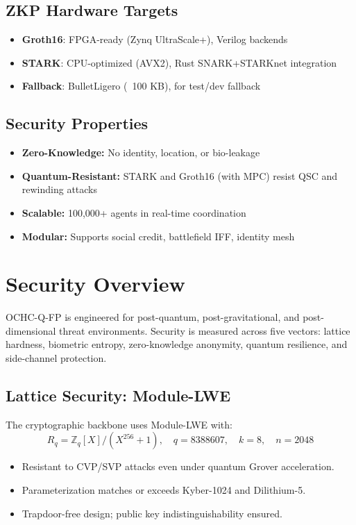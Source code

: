 \documentclass[12pt]{article}
\begin{document}
\subsection*{ZKP Hardware Targets}

\begin{itemize}
    \item \textbf{Groth16}: FPGA-ready (Zynq UltraScale+), Verilog backends
    \item \textbf{STARK}: CPU-optimized (AVX2), Rust SNARK+STARKnet integration
    \item \textbf{Fallback}: BulletLigero (~100 KB), for test/dev fallback
\end{itemize}

\subsection*{Security Properties}

\begin{itemize}
    \item \textbf{Zero-Knowledge:} No identity, location, or bio-leakage
    \item \textbf{Quantum-Resistant:} STARK and Groth16 (with MPC) resist QSC and rewinding attacks
    \item \textbf{Scalable:} 100,000+ agents in real-time coordination
    \item \textbf{Modular:} Supports social credit, battlefield IFF, identity mesh
\end{itemize}
\section*{Security Overview}

OCHC-Q-FP is engineered for post-quantum, post-gravitational, and post-dimensional threat environments. Security is measured across five vectors: lattice hardness, biometric entropy, zero-knowledge anonymity, quantum resilience, and side-channel protection.

\subsection*{Lattice Security: Module-LWE}

The cryptographic backbone uses Module-LWE with:
\[
R_q = \mathbb{Z}_q[X] / (X^{256} + 1), \quad q = 8388607, \quad k = 8, \quad n = 2048
\]
\begin{itemize}
    \item Resistant to CVP/SVP attacks even under quantum Grover acceleration.
    \item Parameterization matches or exceeds Kyber-1024 and Dilithium-5.
    \item Trapdoor-free design; public key indistinguishability ensured.
\end{itemize}
\end{document}
